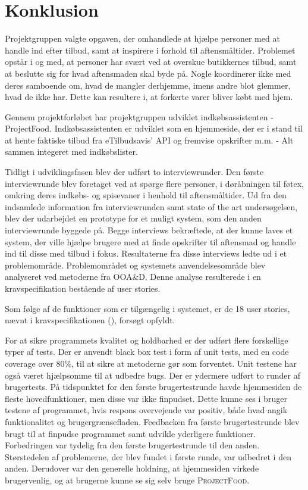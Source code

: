 \chapter{Konklusion}
Projektgruppen valgte opgaven, der omhandlede at hjælpe personer med at handle ind efter tilbud, samt at inspirere i forhold til aftensmåltider.
Problemet opstår i og med, at personer har svært ved at overskue butikkernes tilbud, samt at beslutte sig for hvad aftensmaden skal byde på.
Nogle koordinerer ikke med deres samboende om, hvad de mangler derhjemme, imens andre blot glemmer, hvad de ikke har.
Dette kan resultere i, at forkerte varer bliver købt med hjem.

Gennem projektforløbet har projektgruppen udviklet indkøbsassistenten - ProjectFood. 
Indkøbsassistenten er udviklet som en hjemmeside, der er i stand til at hente faktiske tilbud fra eTilbudsavis’ API og fremvise opskrifter m.m. - Alt sammen integeret med indkøbslister.

Tidligt i udviklingsfasen blev der udført to interviewrunder.  
Den første interviewrunde blev foretaget ved at spørge flere personer, i døråbningen til føtex, omkring deres indkøbs- og spisevaner i henhold til aftensmåltider.
Ud fra den indsamlede information fra interviewrunden samt state of the art undersøgelsen, blev der udarbejdet en prototype for et muligt system, som den anden interviewrunde byggede på. 
Begge interviews bekræftede, at der kunne laves et system, der ville hjælpe brugere med at finde opskrifter til aftensmad og handle ind til disse med tilbud i fokus.  
Resultaterne fra disse interviews ledte ud i et problemområde.
Problemområdet og systemets anvendelsesområde blev analyseret ved metoderne fra OOA\&D.
Denne analyse resulterede i en kravspecifikation bestående af user stories.

Som følge af de funktioner som er tilgængelig i systemet, er de 18 user stories, nævnt i kravspecifikationen (), forsøgt opfyldt. 

For at sikre programmets kvalitet og holdbarhed er der udført flere forskellige typer af tests.
Der er anvendt black box test i form af unit tests, med en code coverage over 80\%, til at sikre at metoderne gør som forventet. 
Unit testene har også været hjælpsomme til at udbedre bugs. 
Der er ydermere udført to runder af brugertests. 
På tidspunktet for den første brugertestrunde havde hjemmesiden de fleste hovedfunktioner, men disse var ikke finpudset. 
Dette kunne ses i bruger testene af programmet, hvis respons overvejende var positiv, både hvad angik funktionalitet og brugergrænsefladen. 
Feedbacken fra første brugertestrunde blev brugt til at finpudse programmet samt udvikle yderligere funktioner. 
Forbedringen var tydelig fra den første brugertestrunde til den anden.
Størstedelen af problemerne, der blev fundet i første runde, var udbedret i den anden. 
Derudover var den generelle holdning, at hjemmesiden virkede brugervenlig, og at brugerne kunne se sig selv bruge \textsc{ProjectFood}.

